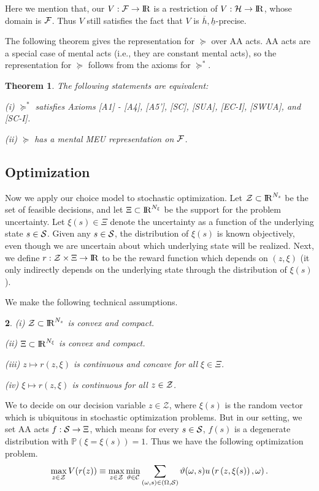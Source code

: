 \documentclass[11pt,oneside]{article}
\theoremstyle{plain}
\theoremstyle{plain}
\theoremstyle{plain}
\newtheorem{thm}{Theorem}[section]
\theoremstyle{plain}
\theoremstyle{plain}
\newtheorem{assumption}[thm]{\protect\assumptionname}
\theoremstyle{definition}
\theoremstyle{definition}
\theoremstyle{remark}
\theoremstyle{plain}
\providecommand{\assumptionname}{Assumption}
\newcommand{\R}{{\rm I\!R}}
\newcommand{\F}{{\cal F}}
\newcommand{\ulh}{\underline{h}}
\newcommand{\olh}{\overline{h}}
\newcommand{\mcs}{{\cal S}}
\newcommand{\pf}{\succeq}
\newcommand{\pfs}{\succeq^*}
\begin{document}
Here we mention that, our $V:\F \to \R$ is a restriction of $V:\mathcal{H}\to \R$, whose domain is $\F$. Thus $V$ still satisfies the fact that 
$V$ is $\olh,\ulh$-precise.

The following theorem gives the representation for $\pf$ over AA acts. AA acts are a special case of mental acts (i.e., they are constant mental acts), so the representation for $\pf$ follows from the axioms for $\pfs$.

\begin{thm}
\label{thm:DPRO}
The following statements are equivalent:

(i) $\pfs$ satisfies Axioms [A1] - [A4], [A5'], [SC], [SUA], [EC-I], [SWUA], and [SC-I].

(ii) $\pf$ has a mental MEU representation on $\F$.

\end{thm}


\subsection{Optimization}

Now we apply our choice model to stochastic optimization.
Let ${\cal Z} \subset \R^{N_z}$ be the set of feasible decisions, and let $\Xi \subset \R^{N_{\xi}}$ be the support for the problem uncertainty.
Let $\xi(s) \in \Xi$ denote the uncertainty as a function of the underlying state $s \in \mcs$.
Given any $s \in \mcs$, the distribution of $\xi(s)$ is known objectively, even though we are uncertain about which underlying state will be realized.
Next, we define $r : {\cal Z} \times \Xi \rightarrow \R$ to be the reward function which depends on $(z, \xi)$ (it only indirectly depends on the underlying state through the distribution of $\xi(s)$).

We make the following technical assumptions.
%
\begin{assumption}
\label{assu:optimization}
(i) ${\cal Z} \subset \R^{N_z}$ is convex and compact.

(ii) $\Xi \subset \R^{N_\xi}$ is convex and compact.

(iii) $z \mapsto r(z, \xi)$ is continuous and concave for all $\xi \in \Xi$.

(iv) $\xi \mapsto r(z, \xi)$ is continuous for all $z \in {\cal Z}$.
\end{assumption}
%

We to decide on our decision variable $z \in \mathcal{Z}$, where $\xi(s)$ is the random vector which is ubiquitous in stochastic optimization problems.
But in our setting, we set AA acts $f : \mcs \to \Xi$, which means for every $s \in \mcs$, $f(s)$ is a degenerate distribution with $\mathbb{P}\left(\xi = \xi(s)\right) =1$. Thus we have 
the following optimization problem.
%
\begin{equation}
\label{eq:opt}
\max_{z \in {\cal Z}} V(r(z)) \equiv \max_{z \in {\cal Z}} \min_{\vartheta \in {\cal C}} \sum_{(\omega,s) \in (\Omega, \mcs)} \vartheta(\omega,s) u\left(r\left(z, \xi(s)\right), \omega\right).
\end{equation}
%
\end{document}
